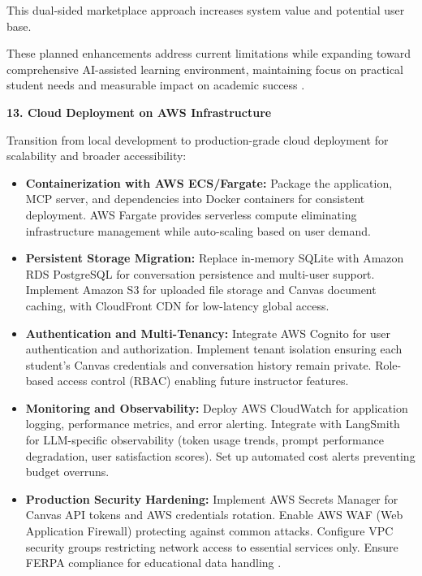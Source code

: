 \documentclass{article}
\begin{document}
This dual-sided marketplace approach increases system value and potential user base.

These planned enhancements address current limitations while expanding toward comprehensive AI-assisted learning environment, maintaining focus on practical student needs and measurable impact on academic success \cite{genai2024higher, lms2025ai}.

\textbf{13. Cloud Deployment on AWS Infrastructure}

Transition from local development to production-grade cloud deployment for scalability and broader accessibility:

\begin{itemize}
    \item \textbf{Containerization with AWS ECS/Fargate:} Package the application, MCP server, and dependencies into Docker containers for consistent deployment. AWS Fargate provides serverless compute eliminating infrastructure management while auto-scaling based on user demand.
    
    \item \textbf{Persistent Storage Migration:} Replace in-memory SQLite with Amazon RDS PostgreSQL for conversation persistence and multi-user support. Implement Amazon S3 for uploaded file storage and Canvas document caching, with CloudFront CDN for low-latency global access.
    
    \item \textbf{Authentication and Multi-Tenancy:} Integrate AWS Cognito for user authentication and authorization. Implement tenant isolation ensuring each student's Canvas credentials and conversation history remain private. Role-based access control (RBAC) enabling future instructor features.
    
    \item \textbf{Monitoring and Observability:} Deploy AWS CloudWatch for application logging, performance metrics, and error alerting. Integrate with LangSmith for LLM-specific observability (token usage trends, prompt performance degradation, user satisfaction scores). Set up automated cost alerts preventing budget overruns.
    
    \item \textbf{Production Security Hardening:} Implement AWS Secrets Manager for Canvas API tokens and AWS credentials rotation. Enable AWS WAF (Web Application Firewall) protecting against common attacks. Configure VPC security groups restricting network access to essential services only. Ensure FERPA compliance for educational data handling \cite{genai2024higher}.
\end{itemize}
\end{document}
